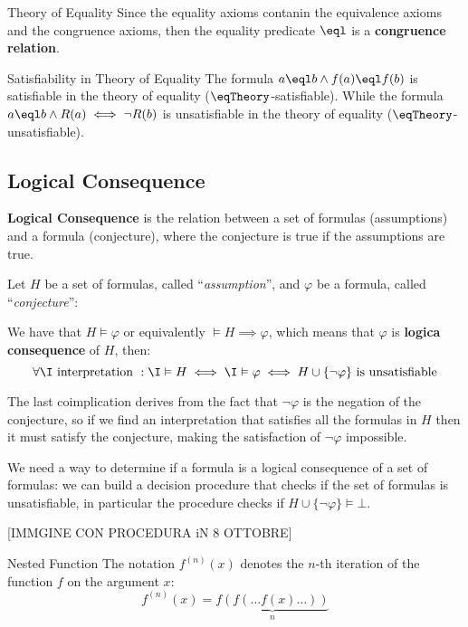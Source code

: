 \begin{remark}{Theory of Equality}
    Since the equality axioms contanin the equivalence axioms and 
    the congruence axioms, then the equality predicate $\eql$ is
    a \textbf{congruence relation}.
\end{remark}

\begin{example}{Satisfiability in Theory of Equality}
    The formula $a \eql b \land f(a) \eql f(b)$ is
    satisfiable in the theory of equality ($\eqTheory$-satisfiable).
    While the formula $a \eql b \land R(a) \iff \neg R(b)$ is
    unsatisfiable in the theory of equality
    ($\eqTheory$-unsatisfiable).
\end{example}

\subsection{Logical Consequence}
\label{subsec:Logical Consequence}

\textbf{Logical Consequence} is the relation between a set of formulas (assumptions) and 
a formula (conjecture), where the conjecture is true if the assumptions are true.

Let $H$ be a set of formulas, called ``\textit{assumption}'',
and $\varphi$ be a formula, called ``\textit{conjecture}'':

We have that $H \vDash \varphi$ or equivalently $\vDash H \implies \varphi$,
which means that $\varphi$ is \textbf{logica consequence} of $H$, then:
\begin{equation*}
    \forall \I \text{ interpretation }: \I \vDash H 
    \iff \I \vDash \varphi \iff H \cup \{\neg \varphi\} \text{ is unsatisfiable}
\end{equation*}

The last coimplication derives from the fact that $\neg \varphi$ is the negation of 
the conjecture, so if we find an interpretation that satisfies all the formulas in $H$ 
then it must satisfy the conjecture, making the satisfaction of 
$\neg \varphi$ impossible.

We need a way to determine if a formula is a logical consequence of a set of formulas:
we can build a decision procedure that checks if the set of formulas is unsatisfiable,
in particular the procedure checks if $H \cup \{\neg \varphi\} \vDash \bot$.

[IMMGINE CON PROCEDURA iN 8 OTTOBRE]

\begin{notation}{Nested Function}
    The notation $f^{(n)}(x)$ denotes the 
    $n$-th iteration of the function $f$ on the argument $x$:
    \begin{equation*}
        f^{(n)}(x) = \underbrace{f(f(\dots f(x) \dots))}_{n}
    \end{equation*}
\end{notation}

